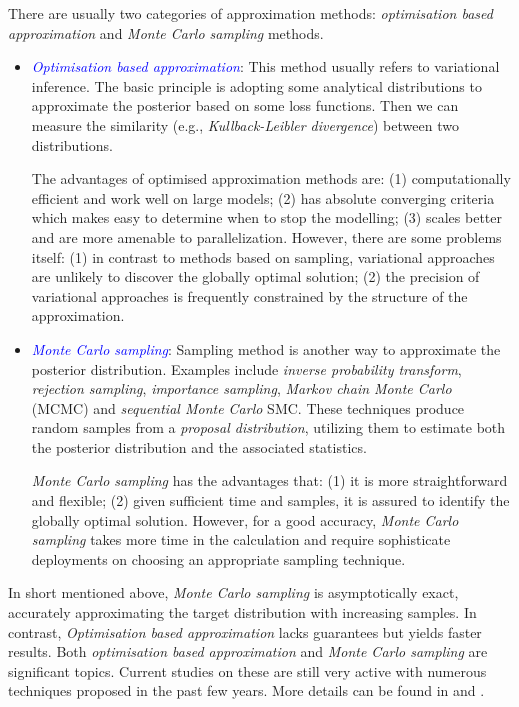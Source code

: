 There are usually two categories of approximation methods: \textit{optimisation based approximation} and \textit{Monte Carlo sampling} methods.
\begin{itemize}[left=0pt]
    \item \textcolor{blue}{\textit{Optimisation based approximation}}: This method usually refers to variational inference. The basic principle is adopting some analytical distributions to approximate the posterior based on some loss functions. Then we can measure the similarity (e.g., \textit{Kullback-Leibler divergence}) between two distributions.

The advantages of optimised approximation methods are: (1) computationally efficient and work well on large models; (2) has absolute converging criteria which makes easy to determine when to stop the modelling; (3) scales better and are more amenable to parallelization. However, there are some problems itself: (1) in contrast to methods based on sampling, variational approaches are unlikely to discover the globally optimal solution; (2) the precision of variational approaches is frequently constrained by the structure of the approximation.
    \item \textcolor{blue}{\textit{Monte Carlo sampling}}: Sampling method is another way to approximate the posterior distribution. Examples include \textit{inverse probability transform}, \textit{rejection sampling}, \textit{importance sampling}, \textit{Markov chain Monte Carlo} (\acrshort{MCMC}) and \textit{sequential Monte Carlo} \acrshort{SMC}. These techniques produce random samples from a \textit{proposal distribution}, utilizing them to estimate both the posterior distribution and the associated statistics.

  \textit{Monte Carlo sampling} has the advantages that: (1) it is more straightforward and flexible; (2) given sufficient time and samples, it is assured to identify the globally optimal solution. However, for a good accuracy, \textit{Monte Carlo sampling} takes more time in the calculation and require sophisticate deployments on choosing an appropriate sampling technique. 
\end{itemize}

In short mentioned above, \textit{Monte Carlo sampling} is asymptotically exact, accurately approximating the target distribution with increasing samples. In contrast, \textit{Optimisation based approximation} lacks guarantees but yields faster results. Both \textit{optimisation based approximation} and \textit{Monte Carlo sampling} are significant topics. Current studies on these are still very active with numerous techniques proposed in the past few years. More details can be found in \cite{murphy2012} and \cite{blei2017}.

